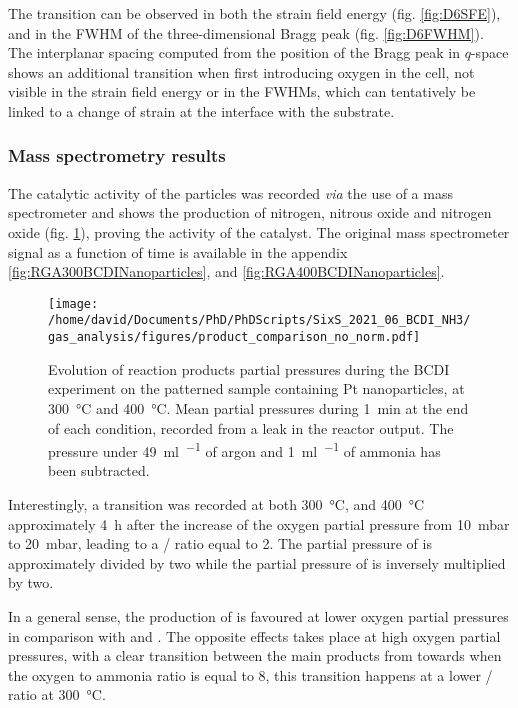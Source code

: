 The transition can be observed in both the strain field energy (fig. \ref{fig:D6SFE}), and in the FWHM of the three-dimensional Bragg peak (fig. \ref{fig:D6FWHM}).
The interplanar spacing computed from the position of the Bragg peak in $q$-space shows an additional transition when first introducing oxygen in the cell, not visible in the strain field energy or in the FWHMs, which can tentatively be linked to a change of strain at the interface with the substrate.

\subsubsection{Mass spectrometry results}

The catalytic activity of the particles was recorded \textit{via} the use of a mass spectrometer and shows the production of nitrogen, nitrous oxide and nitrogen oxide (fig. \ref{fig:RGANanoparticlesBCDIComparison}), proving the activity of the catalyst.
The original mass spectrometer signal as a function of time is available in the appendix \ref{fig:RGA300BCDINanoparticles}, and \ref{fig:RGA400BCDINanoparticles}.

\begin{figure}[!htb]
    \centering
    \texttt{[image: /home/david/Documents/PhD/PhDScripts/SixS\_2021\_06\_BCDI\_NH3/gas\_analysis/figures/product\_comparison\_no\_norm.pdf]}
    \caption{
        Evolution of reaction products partial pressures during the BCDI experiment on the patterned sample containing Pt nanoparticles, at \qty{300}{\degreeCelsius} and \qty{400}{\degreeCelsius}.
        Mean partial pressures during \qty{1}{\minute} at the end of each condition, recorded from a leak in the reactor output.
        The pressure under \qty{49}{\ml\per\min} of argon and \qty{1}{\ml\per\min} of ammonia has been subtracted.
    }
    \label{fig:RGANanoparticlesBCDIComparison}
\end{figure}

Interestingly, a transition was recorded at both \qty{300}{\degreeCelsius}, and \qty{400}{\degreeCelsius} approximately \qty{4}{\hour} after the increase of the oxygen partial pressure from \qty{10}{\milli\bar} to \qty{20}{\milli\bar}, leading to a / ratio equal to 2.
The partial pressure of  is approximately divided by two while the partial pressure of  is inversely multiplied by two.

In a general sense, the production of  is favoured at lower oxygen partial pressures in comparison with  and .
The opposite effects takes place at high oxygen partial pressures, with a clear transition between the main products from  towards  when the oxygen to ammonia ratio is equal to 8, this transition happens at a lower / ratio at \qty{300}{\degreeCelsius}.
